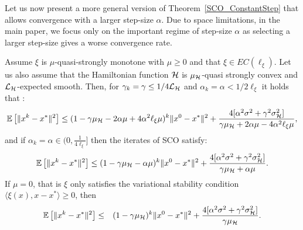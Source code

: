 \documentclass{article}
\begin{document}
Let us now present a more general version of Theorem~\ref{SCO_ConstantStep} that allows convergence with a larger step-size $\alpha$. Due to space limitations, in the main paper, we focus only on the important regime of step-size $\alpha$ as selecting a larger step-size gives a worse convergence rate.
\begin{theorem}
\label{Appendix_SCO_ConstantStep}
Assume $\xi$ is $\mu$-quasi-strongly monotone with $\mu \geq 0$ and that $\xi \in EC( \ell_{\xi})$.
Let us also assume that the Hamiltonian function ${\cal H}$ is $\mu_{{\cal H}}$-quasi strongly convex and ${\cal L}_{{\cal H}}$-expected smooth. Then, for $\gamma_k=\gamma \leq 1/4{\cal L}_{{\cal H}}$ and $\alpha_k=\alpha < 1/2  \ell_{\xi}$  it holds that :
\begin{eqnarray}
\mathbb{E}\left[ \|x^{k}-x^*\|^2 \right]\leq(1-\gamma\mu_{{\cal H}}  -2 \alpha\mu + 4\alpha^2 \ell_\xi \mu )^k\|x^0-x^*\|^2 + \frac{4[\alpha^2 \sigma^2 + \gamma^2  \sigma_{{\cal H}}^2]}{\gamma\mu_{{\cal H}} +2 \alpha\mu - 4\alpha^2 \ell_\xi \mu},
\end{eqnarray}
and if $\alpha_k=\alpha \in (0, \frac{1}{4\ell_\xi}]$ then the iterates of SCO satisfy:
\begin{eqnarray}
\mathbb{E}\left[ \|x^{k}-x^*\|^2 \right]\leq(1-\gamma\mu_{{\cal H}}  - \alpha\mu )^k\|x^0-x^*\|^2 + \frac{4[\alpha^2 \sigma^2 + \gamma^2  \sigma_{{\cal H}}^2]}{\gamma\mu_{{\cal H}}  +\alpha\mu}.
\end{eqnarray}
If $\mu=0$, that is $\xi$ only satisfies the variational stability condition $\langle\xi(x),x-x^*\rangle \geq0$, then
\begin{eqnarray}
\mathbb{E} \left[ \|x^{k}-x^*\|^2 \right]&\leq& (1-\gamma \mu_{{\cal H}})^k \|x^0-x^*\|^2  + \frac{4 [\alpha^2 \sigma^2 +  \gamma^2  \sigma_{{\cal H}}^2]}{\gamma \mu_{{\cal H}} }.
\end{eqnarray}
\end{theorem}
\end{document}
